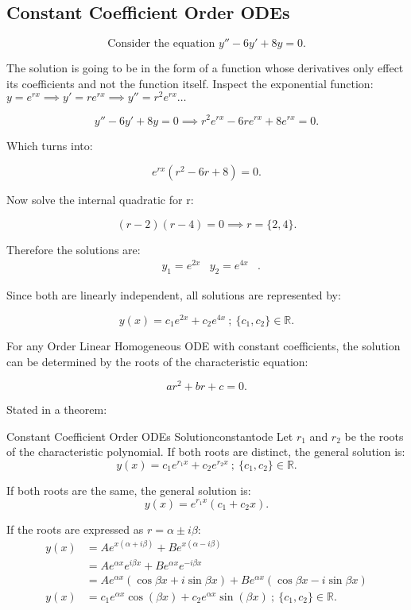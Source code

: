 \documentclass[../notes.tex]{subfiles}
\begin{document}
\subsection{Constant Coefficient  Order ODEs}

\[
\text{Consider the equation } y''-6y'+8y = 0
.\] 

The solution is going to be in the form of a function whose derivatives only effect its coefficients and not the function itself. Inspect the exponential function: $y=e^{rx} \implies y'=re^{rx} \implies y''=r^2e^{rx}\ldots$


\[
y''-6y'+8y = 0 \implies r^2e^{rx} -6re^{rx} + 8e^{rx} = 0
.\] 

Which turns into:

\[
e^{rx} \left( r^2 -6r + 8 \right) = 0
.\] 

Now solve the internal quadratic for r:

\[
				(r-2)(r-4) = 0 \implies r=\{2,4\}
.\] 

Therefore the solutions are:
\begin{align*}
				& y_1=e^{2x} & y_2=e^{4x} &
.\end{align*}

Since both are linearly independent, all solutions are represented by:

\[
				y(x) = c_1 e^{2x} + c_2 e^{4x} \: ; \: \{c_1,c_2\} \in \mathbb{R}
.\] 

For any  Order Linear Homogeneous ODE with constant coefficients, the solution can be determined by the roots of the characteristic equation:

\[
ar^2 + br + c = 0
.\]

Stated in a theorem:

\begin{theorem}{Constant Coefficient  Order ODEs Solution}{constantode}
				Let $r_1$ and $r_2$ be the roots of the characteristic polynomial. If both roots are distinct, the general solution is:
				\[
				y(x) = c_1 e^{r_1x} + c_2 e^{r_2x} \: ; \: \{c_1,c_2\} \in \mathbb{R}
				.\] 

If both roots are the same, the general solution is:
\[
				y(x) = e^{r_1x} \left( c_1 + c_2 x \right) 
.\] 

If the roots are expressed as $r = \alpha \pm i \beta$:
\begin{align*}
				y(x) &= Ae^{x(\alpha + i \beta)} + Be^{x(\alpha - i \beta)} \\
				&= Ae^{\alpha x} e^{i\beta x} + Be^{\alpha x} e^{-i\beta x} \\
				&= Ae^{\alpha x} (\cos{\beta x} + i\sin{\beta x}) + Be^{\alpha x}(\cos{\beta x} - i\sin{\beta x}) \\
				y(x) &= c_1 e^{\alpha x} \cos{(\beta x)} + c_2 e^{\alpha x} \sin{(\beta x)} \: ; \: \{c_1,c_2\} \in \mathbb{R}
.\end{align*}

\end{theorem}
\end{document}
